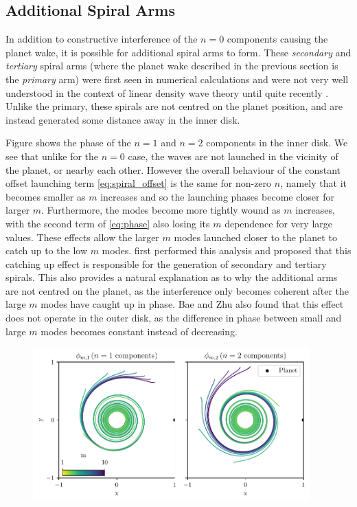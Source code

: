 \subsection{Additional Spiral Arms}

In addition to constructive interference of the $n=0$ components causing the planet wake, it is possible for additional spiral arms to form.
These \textit{secondary} and \textit{tertiary} spiral arms (where the planet wake described in the previous section is the \textit{primary} arm) were first seen in numerical calculations \fct and were not very well understood in the context of linear density wave theory until quite recently \citep{bae2018a,miranda2019a}.
Unlike the primary, these spirals are not centred on the planet position, and are instead generated some distance away in the inner disk.

Figure  shows the phase of the $n=1$ and $n=2$ components in the inner disk.
We see that unlike for the $n=0$ case, the waves are not launched in the vicinity of the planet, or nearby each other.
However the overall behaviour of the constant offset launching term \ref{eq:spiral_offset} is the same for non-zero $n$, namely that it becomes smaller as $m$ increases and so the launching phases become closer for larger $m$.
Furthermore, the modes become more tightly wound as $m$ increases, with the second term of \ref{eq:phase} also losing its $m$ dependence for very large values.
These effects allow the larger $m$ modes launched closer to the planet to catch up to the low $m$ modes.
\citet{bae2018a} first performed this analysis and proposed that this catching up effect is responsible for the generation of secondary and tertiary spirals.
This also provides a natural explanation as to why the additional arms are not centred on the planet, as the interference only becomes coherent after the large $m$ modes have caught up in phase.
Bae and Zhu also found that this effect does not operate in the outer disk, as the difference in phase between small and large $m$ modes becomes constant instead of decreasing.

\begin{figure}
    \centering
    \includegraphics[width = 0.95\textwidth]{figures/inner_n_1_and_2.pdf}
    \caption{}
    \label{fig:additional_arms}
\end{figure}


